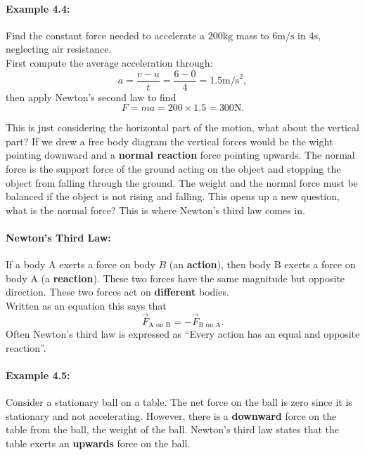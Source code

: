 \documentclass[a4paper,12pt]{book}
\begin{document}
\paragraph{Example 4.4:} Find the constant force needed to accelerate a $200\text{kg}$ mass to $6\text{m/s}$ in $4\text{s}$, neglecting air resistance.\\

First compute the average acceleration through:
\begin{equation*}
a=\frac{v-u}{t}=\frac{6-0}{4}=1.5\text{m/s}^{2},
\end{equation*}
then apply Newton's second law to find
\begin{equation*}
F=ma=200\times 1.5 =300\text{N}.
\end{equation*}

This is just considering the horizontal part of the motion, what about the vertical part? If we drew a free body diagram the vertical forces would be the wight pointing downward and a \textbf{normal reaction} force pointing upwards. The normal force is the support force of the ground acting on the object and stopping the object from falling through the ground. The weight and the normal force must be balanced if the object is not rising and falling. This opens up a new question, what is the normal force? This is where Newton's third law comes in.

\paragraph{Newton's Third Law:} If a body A exerts a force on body $B$ (an \textbf{action}), then body B exerts a force on body A (a \textbf{reaction}). These two forces have the same magnitude but opposite direction. These two forces act on \textbf{different} bodies.\\

Written as an equation this says that
\begin{equation*}
\vec{F}_{\text{A on B}}=-\vec{F}_{\text{B on A}}.
\end{equation*}
Often Newton's third law is expressed as ``Every action has an equal and opposite reaction''.

\paragraph{Example 4.5:} Consider a stationary ball on a table. The net force on the ball is zero since it is stationary and not accelerating. However, there is a \textbf{downward} force on the table from the ball, the weight of the ball. Newton's third law states that the table exerts an \textbf{upwards} force on the ball.\\
\end{document}
